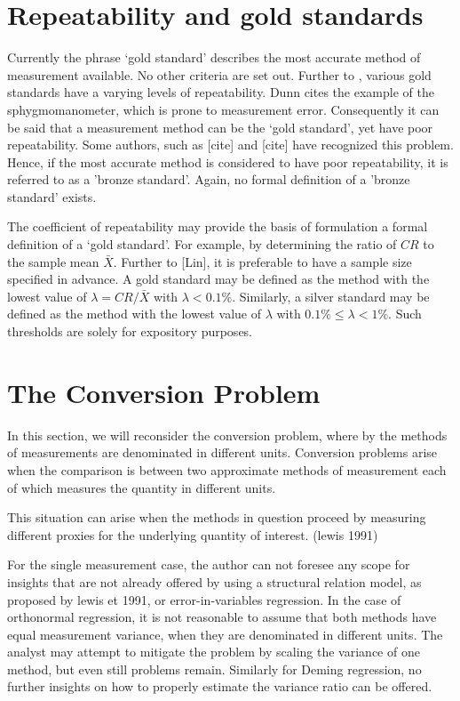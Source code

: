 \documentclass[12pt, a4paper]{report}
\theoremstyle{plain}
\theoremstyle{definition}
\theoremstyle{remark}
\begin{document}
\section{Repeatability and gold standards}
	Currently the phrase `gold standard' describes the most accurate method of measurement available. No other criteria are set out. Further to \citet{dunnSEME}, various gold standards have a varying levels of repeatability. Dunn cites the example of the sphygmomanometer, which is prone to measurement error. Consequently it can be said that a measurement method can be the `gold standard', yet have poor repeatability. Some authors, such as [cite] and [cite] have recognized this problem. Hence, if the most accurate method is considered to have poor repeatability, it is referred to as a 'bronze standard'.  Again, no formal definition of a 'bronze standard' exists.
	
	The coefficient of repeatability may provide the basis of formulation a formal definition of a `gold standard'. For example, by determining the ratio of $CR$ to the sample mean $\bar{X}$. Further to [Lin], it is preferable to have a sample size specified in advance. A gold standard may be defined as the method with the lowest value of $\lambda = CR /\bar{X}$ with $\lambda < 0.1\%$. Similarly, a silver standard may be defined as the method with the lowest value of $\lambda $ with $0.1\% \leq \lambda < 1\%$. Such thresholds are solely for expository purposes.
	
	\section{The Conversion Problem}

In this section, we will reconsider the conversion problem, where by the methods of measurements are denominated in different units.
Conversion problems arise when the comparison is between two 
approximate methods of measurement each of which measures the quantity in different units.

This situation can arise when the methods in question proceed by measuring different proxies for the underlying 
quantity of interest. (lewis 1991)

For the single measurement case, the author can not foresee any scope for insights that are not already offered by using a structural relation model, as proposed by lewis et 1991, or error-in-variables regression. 
In the case of orthonormal regression, it is not reasonable to assume that both methods have equal measurement variance, when they are denominated in different units.
The analyst may attempt to mitigate the problem by scaling the variance of one method, but even still problems remain.
Similarly for Deming regression, no further insights on how to properly estimate the variance ratio can be offered.
\end{document}
